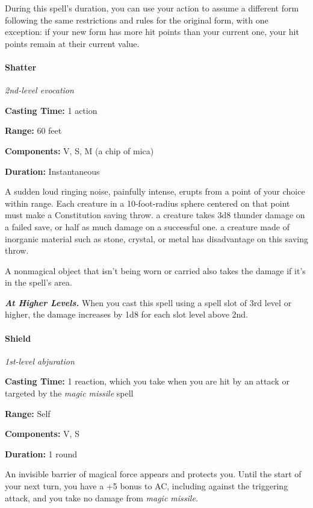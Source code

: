 \documentclass[
]{article}
\begin{document}
During this spell's duration, you can use your action to assume a
different form following the same restrictions and rules for the
original form, with one exception: if your new form has more hit points
than your current one, your hit points remain at their current value.

\hypertarget{shatter}{%
\paragraph{Shatter}\label{shatter}}

\emph{2nd-level evocation}

\textbf{Casting Time:} 1 action

\textbf{Range:} 60 feet

\textbf{Components:} V, S, M (a chip of mica)

\textbf{Duration:} Instantaneous

A sudden loud ringing noise, painfully intense, erupts from a point of
your choice within range. Each creature in a 10-foot-radius sphere
centered on that point must make a Constitution saving throw. a creature
takes 3d8 thunder damage on a failed save, or half as much damage on a
successful one. a creature made of inorganic material such as stone,
crystal, or metal has disadvantage on this saving throw.

A nonmagical object that isn't being worn or carried also takes the
damage if it's in the spell's area.

\emph{\textbf{At Higher Levels.}} When you cast this spell using a spell
slot of 3rd level or higher, the damage increases by 1d8 for each slot
level above 2nd.

\hypertarget{shield}{%
\paragraph{Shield}\label{shield}}

\emph{1st-level abjuration}

\textbf{Casting Time:} 1 reaction, which you take when you are hit by an
attack or targeted by the \emph{magic missile} spell

\textbf{Range:} Self

\textbf{Components:} V, S

\textbf{Duration:} 1 round

An invisible barrier of magical force appears and protects you. Until
the start of your next turn, you have a +5 bonus to AC, including
against the triggering attack, and you take no damage from \emph{magic
missile.}
\end{document}
